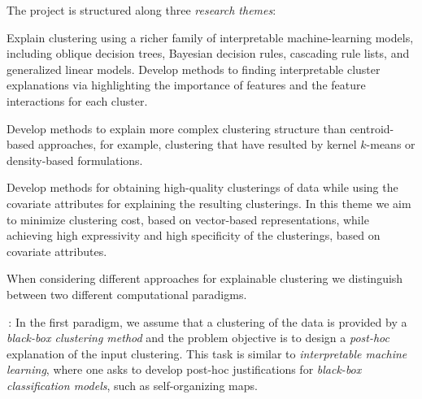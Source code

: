 \documentclass[a4paper,11pt]{article}
\begin{document}

The project is structured along three {\em research themes}:

\vspace{-2mm}
\begin{description}
\setlength{\itemsep}{-2pt}
\item[\rto.~\newmodels\,:] 
Explain clustering using a richer family of interpretable machine-learning models, 
including oblique decision trees, Bayesian decision rules, cascading rule lists, and 
generalized linear models. 
Develop methods to finding interpretable cluster explanations 
via highlighting the importance of features and the feature interactions for each cluster.

\item[\rtw.~\clusterings\,:] 
Develop methods to explain more complex clustering structure than centroid-based approaches,
for example, clustering that have resulted by kernel $k$-means or density-based formulations.

\item[\rth.~\covariates\,:]
Develop methods for obtaining high-quality clusterings of data 
while using the covariate attributes for explaining the resulting clusterings. 
In this theme we aim to minimize clustering cost, based on vector-based representations, 
while achieving high expressivity and high specificity of the clusterings, 
based on covariate attributes.

\end{description}

\vspace{-2mm}
When considering different approaches for explainable clustering we distinguish between 
two different computational paradigms. 


\smallskip
{\posthoc\,:}
In the first paradigm, we assume that a clustering of the data is provided 
by a \emph{black-box clustering method} and the problem objective is to design 
a \emph{post-hoc} explanation of the input clustering.
This task is similar to \emph{interpretable machine learning}, 
where one asks to develop post-hoc justifications for 
\emph{black-box classification models}, such as self-organizing maps. 
\end{document}
